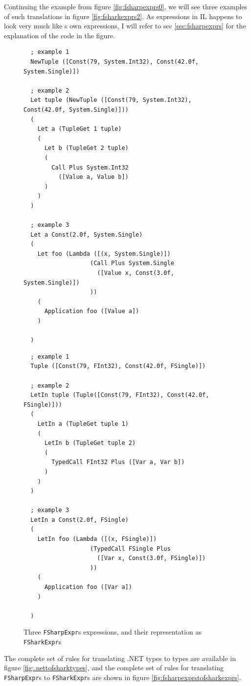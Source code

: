 Continuing the example from figure \ref{fig:fsharpexprs0}, we will see three
examples of such translations in figure \ref{fig:fsharkexprs2}.
As expressions in \fshark{}IL happens to look very much like \fshark{}s own
expressions, I will refer to sec \ref{sec:fsharpexprs} for the explanation of the
code in the figure.

\begin{figure}[H]
  \centering
\begin{verbatim}
  ; example 1
  NewTuple ([Const(79, System.Int32), Const(42.0f, System.Single)])

  ; example 2
  Let tuple (NewTuple ([Const(79, System.Int32), Const(42.0f, System.Single)]))
  ( 
    Let a (TupleGet 1 tuple) 
    (
      Let b (TupleGet 2 tuple) 
      (
        Call Plus System.Int32 
          ([Value a, Value b])
      )       
    )
  )

  ; example 3
  Let a Const(2.0f, System.Single)
  (
    Let foo (Lambda ([(x, System.Single)]) 
                   (Call Plus System.Single 
                     ([Value x, Const(3.0f, System.Single)])
                   ))
    (
      Application foo ([Value a])
    )

  )
\end{verbatim}
\begin{verbatim}
  ; example 1
  Tuple ([Const(79, FInt32), Const(42.0f, FSingle)])

  ; example 2
  LetIn tuple (Tuple([Const(79, FInt32), Const(42.0f, FSingle)]))
  ( 
    LetIn a (TupleGet tuple 1) 
    (
      LetIn b (TupleGet tuple 2) 
      (
        TypedCall FInt32 Plus ([Var a, Var b])
      )       
    )
  )

  ; example 3
  LetIn a Const(2.0f, FSingle)
  (
    LetIn foo (Lambda ([(x, FSingle)]) 
                   (TypedCall FSingle Plus
                     ([Var x, Const(3.0f, FSingle)])
                   ))
    (
      Application foo ([Var a])
    )

  )
\end{verbatim}
  \caption{Three \texttt{FSharpExpr}s expressions, and their representation as \texttt{FSharkExpr}s}
  \label{fig:fsharpexprs2}
\end{figure}

The complete set of rules for translating .NET types to \fshark{} types are
available in figure \ref{fig:.nettofsharktypes}, and the complete set of rules
for translating \texttt{FSharpExpr}s to \texttt{FSharkExpr}s are shown in figure \ref{fig:fsharpexprstofsharkexprs}.

